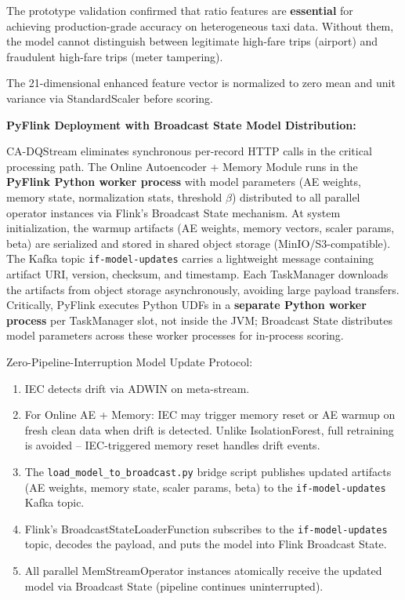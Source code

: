 The prototype validation confirmed that ratio features are \textbf{essential} for achieving production-grade accuracy on heterogeneous taxi data. Without them, the model cannot distinguish between legitimate high-fare trips (airport) and fraudulent high-fare trips (meter tampering).

The 21-dimensional enhanced feature vector is normalized to zero mean and unit variance via StandardScaler before scoring.

\textbf{PyFlink Deployment with Broadcast State Model Distribution:}

CA-DQStream eliminates synchronous per-record HTTP calls in the critical processing path. The Online Autoencoder + Memory Module runs in the \textbf{PyFlink Python worker process} with model parameters (AE weights, memory state, normalization stats, threshold $\beta$) distributed to all parallel operator instances via Flink's Broadcast State mechanism. At system initialization, the warmup artifacts (AE weights, memory vectors, scaler params, beta) are serialized and stored in shared object storage (MinIO/S3-compatible). The Kafka topic \texttt{if-model-updates} carries a lightweight message containing artifact URI, version, checksum, and timestamp. Each TaskManager downloads the artifacts from object storage asynchronously, avoiding large payload transfers. Critically, PyFlink executes Python UDFs in a \textbf{separate Python worker process} per TaskManager slot, not inside the JVM; Broadcast State distributes model parameters across these worker processes for in-process scoring.

Zero-Pipeline-Interruption Model Update Protocol:
\begin{enumerate}
    \item IEC detects drift via ADWIN on meta-stream.
    \item For Online AE + Memory: IEC may trigger memory reset or AE warmup on fresh clean data when drift is detected. Unlike IsolationForest, full retraining is avoided -- IEC-triggered memory reset handles drift events.
    \item The \texttt{load\_model\_to\_broadcast.py} bridge script publishes updated artifacts (AE weights, memory state, scaler params, beta) to the \texttt{if-model-updates} Kafka topic.
    \item Flink's BroadcastStateLoaderFunction subscribes to the \texttt{if-model-updates} topic, decodes the payload, and puts the model into Flink Broadcast State.
    \item All parallel MemStreamOperator instances atomically receive the updated model via Broadcast State (pipeline continues uninterrupted).
\end{enumerate}

